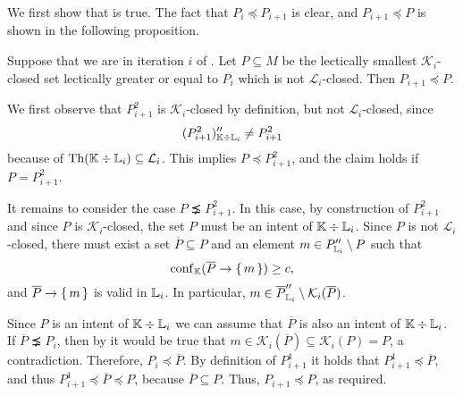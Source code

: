 We first show that  is true.  The fact that $P_{i} \preceq P_{i+1}$ is clear,
and $P_{i+1} \preceq P$ is shown in the following proposition.
\begin{Proposition}
  \label{prop:exploration-by-confidence-first-condition-holds}
  Suppose that we are in iteration $i$ of
  .  Let $P \subseteq M$ be
  the lectically smallest $\mathcal{K}_{i}$-closed set lectically greater or equal to
  $P_{i}$ which is not $\mathcal{L}_{i}$-closed.  Then $P_{i+1} \preceq P$.
\end{Proposition}
\begin{Proof}
  We first observe that $P_{i+1}^{2}$ is $\mathcal{K}_{i}$-closed by definition, but not
  $\mathcal{L}_{i}$-closed, since
  \begin{equation*}
    (P_{i+1}^{2})_{{\mathbb{K}} \div {\ensuremath{\mathbb{L}}}_{i}}'' \neq P_{i+1}^{2}
  \end{equation*}
  because of $\operatorname{Th}({\mathbb{K}} \div {\ensuremath{\mathbb{L}}}_{i}) \subseteq \mathcal{L}_{i}$.  This implies $P
  \preceq P_{i+1}^{2}$, and the claim holds if $P = P_{i+1}^{2}$.

  It remains to consider the case $P \precneq P_{i+1}^{2}$.  In this case, by construction
  of $P_{i+1}^{2}$ and since $P$ is $\mathcal{K}_{i}$-closed, the set $P$ must be an
  intent of ${\mathbb{K}} \div {\ensuremath{\mathbb{L}}}_{i}$.  Since $P$ is not $\mathcal{L}_{i}$-closed, there
  must exist a set $\overline P \subseteq P$ and an element $m \in P_{{\mathbb{L}}_{i}}''
  \setminus P$ such that
  \begin{equation*}
    \operatorname{conf}_{{\mathbb{K}}}(\overline P \to {\ensuremath{\{\,m\,\}}}) \ge c,
  \end{equation*}
  and $\overline P \to {\ensuremath{\{\,m\,\}}}$ is valid in ${\mathbb{L}}_{i}$.  In particular, $m \in \overline
  P_{{\mathbb{L}}_{i}}'' \setminus \mathcal{K}_{i}(\overline P)$.
  
  Since $P$ is an intent of ${\mathbb{K}} \div {\ensuremath{\mathbb{L}}}_{i}$ we can assume that $\overline P$ is
  also an intent of ${\mathbb{K}} \div {\ensuremath{\mathbb{L}}}_{i}$.  If $\overline P \precneq P_{i}$, then by
   it would be true that $m
  \in \mathcal{K}_{i}(\overline P) \subseteq \mathcal{K}_{i}(P) = P$, a contradiction.
  Therefore, $P_{i} \preceq \overline P$.  By definition of $P_{i+1}^{1}$ it holds that
  $P_{i+1}^{1} \preceq \overline P$, and thus $P_{i+1}^{1} \preceq \overline P \preceq P$,
  because $\overline P \subseteq P$.  Thus, $P_{i+1} \preceq P$, as required.
\end{Proof}

